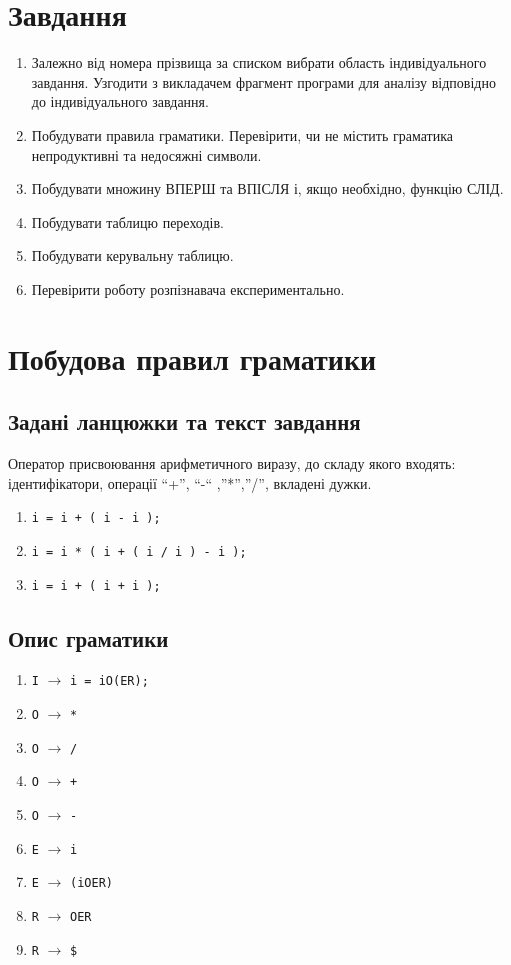 \section{Завдання}
\begin{enumerate}
  \item Залежно від номера прізвища за списком вибрати область індивідуального завдання. Узгодити з викладачем фрагмент програми для аналізу відповідно до індивідуального завдання.
  \item Побудувати правила граматики. Перевірити, чи не містить граматика непродуктивні та недосяжні символи.
  \item Побудувати множину ВПЕРШ та ВПІСЛЯ і, якщо необхідно, функцію СЛІД.
  \item Побудувати таблицю переходів.
  \item Побудувати керувальну таблицю.
  \item Перевірити роботу розпізнавача експериментально.
\end{enumerate}

\section{Побудова правил граматики}
\subsection{Задані ланцюжки та текст завдання}
Оператор присвоювання арифметичного виразу, до складу якого входять:
ідентифікатори, операції “+”, “-“ ,”*”,”/\/”, вкладені дужки.

\begin{enumerate}
    \item \verb|i = i + ( i - i );|
    \item \verb|i = i * ( i + ( i / i ) - i );|
    \item \verb|i = i + ( i + i );|
\end{enumerate}

\clearpage
\subsection{Опис граматики}
\begin{enumerate}
    \item  \verb|I| $\to$ \verb|i = iO(ER);|
    \item  \verb|O| $\to$ \verb|*|
    \item  \verb|O| $\to$ \verb|/|
    \item  \verb|O| $\to$ \verb|+|
    \item  \verb|O| $\to$ \verb|-|
    \item  \verb|E| $\to$ \verb|i|
    \item  \verb|E| $\to$ \verb|(iOER)|
    \item  \verb|R| $\to$ \verb|OER|
    \item  \verb|R| $\to$ \verb|$|
\end{enumerate}

